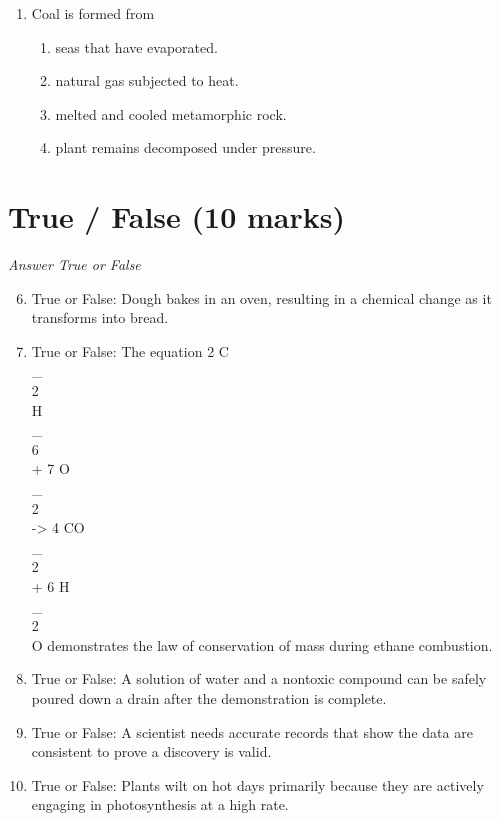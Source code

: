 \documentclass[12pt]{article}
\begin{document}
\begin{enumerate}[label=\arabic*.]
\begin{enumerate}[label=(\alph*)]
    \item having a litter of four babies
\end{enumerate}
\item Coal is formed from
\begin{enumerate}[label=(\alph*)]
    \item seas that have evaporated.
    \item natural gas subjected to heat.
    \item melted and cooled metamorphic rock.
    \item plant remains decomposed under pressure.
\end{enumerate}
\end{enumerate}

\section*{True / False (10 marks)}
\textit{Answer True or False}
\begin{enumerate}[label=\arabic*.]
\setcounter{enumi}{5}
\item True or False: Dough bakes in an oven, resulting in a chemical change as it transforms into bread.
\item True or False: The equation 2 C\\_\\{2\\}H\\_\\{6\\} + 7 O\\_\\{2\\} -\textgreater{} 4 CO\\_\\{2\\} + 6 H\\_\\{2\\}O demonstrates the law of conservation of mass during ethane combustion.
\item True or False: A solution of water and a nontoxic compound can be safely poured down a drain after the demonstration is complete.
\item True or False: A scientist needs accurate records that show the data are consistent to prove a discovery is valid.
\item True or False: Plants wilt on hot days primarily because they are actively engaging in photosynthesis at a high rate.
\end{enumerate}
\end{document}
